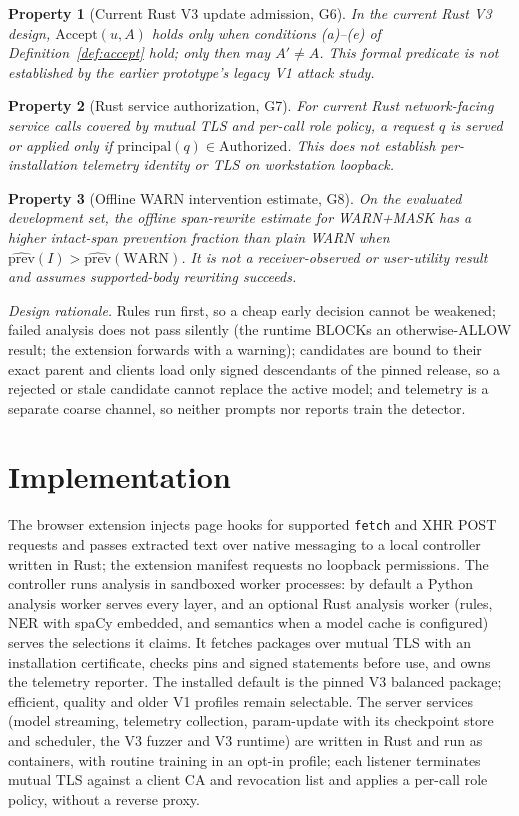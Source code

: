 \documentclass[sigconf]{acmart}
\theoremstyle{acmdefinition}\newtheorem{property}{Property}
\begin{document}
\begin{property}[Current Rust V3 update admission, G6]\label{prop:g6}
In the current Rust V3 design, $\mathrm{Accept}(u,A)$ holds only when conditions (a)--(e) of Definition~\ref{def:accept} hold; only then may $A'\ne A$. This formal predicate is not established by the earlier prototype's legacy V1 attack study.
\end{property}
\begin{property}[Rust service authorization, G7]\label{prop:g7}
For current Rust network-facing service calls covered by mutual TLS and per-call role policy, a request $q$ is served or applied only if $\mathrm{principal}(q)\in\mathrm{Authorized}$. This does not establish per-installation telemetry identity or TLS on workstation loopback.
\end{property}
\begin{property}[Offline WARN intervention estimate, G8]\label{prop:g8}
On the evaluated development set, the offline span-rewrite estimate for WARN+MASK has a higher intact-span prevention fraction than plain WARN when $\widehat{\mathrm{prev}}(I)>\widehat{\mathrm{prev}}(\text{WARN})$. It is not a receiver-observed or user-utility result and assumes supported-body rewriting succeeds.
\end{property}

\textit{Design rationale.} Rules run first, so a cheap early decision cannot be weakened; failed analysis does not pass silently (the runtime BLOCKs an otherwise-ALLOW result; the extension forwards with a warning); candidates are bound to their exact parent and clients load only signed descendants of the pinned release, so a rejected or stale candidate cannot replace the active model; and telemetry is a separate coarse channel, so neither prompts nor reports train the detector.

\section{Implementation}
\label{sec:implementation}
The browser extension injects page hooks for supported \texttt{fetch} and XHR POST requests and passes extracted text over native messaging to a local controller written in Rust; the extension manifest requests no loopback permissions. The controller runs analysis in sandboxed worker processes: by default a Python analysis worker serves every layer, and an optional Rust analysis worker (rules, NER with spaCy embedded, and semantics when a model cache is configured) serves the selections it claims. It fetches packages over mutual TLS with an installation certificate, checks pins and signed statements before use, and owns the telemetry reporter. The installed default is the pinned V3 balanced package; efficient, quality and older V1 profiles remain selectable. The server services (model streaming, telemetry collection, param-update with its checkpoint store and scheduler, the V3 fuzzer and V3 runtime) are written in Rust and run as containers, with routine training in an opt-in profile; each listener terminates mutual TLS against a client CA and revocation list and applies a per-call role policy, without a reverse proxy.
\end{document}

